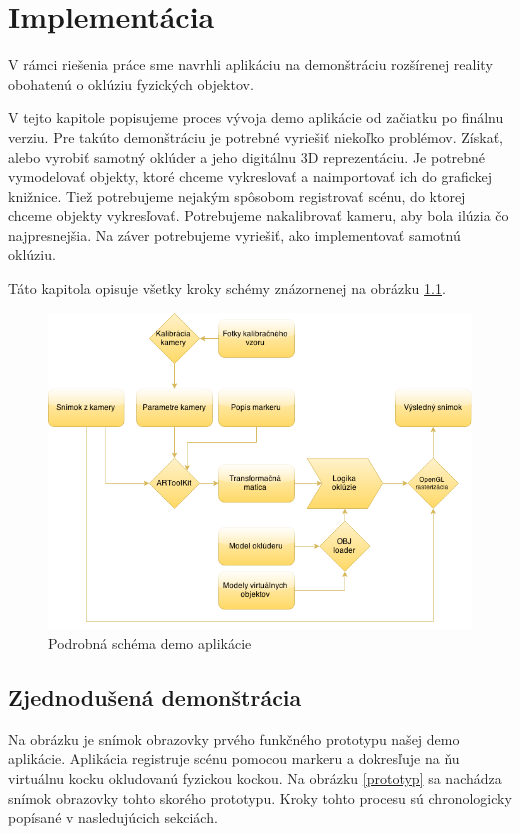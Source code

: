 \chapter{Implementácia}

V rámci riešenia práce sme navrhli aplikáciu na demonštráciu rozšírenej reality obohatenú o oklúziu fyzických objektov.

V tejto kapitole popisujeme proces vývoja demo aplikácie od začiatku po finálnu verziu. Pre takúto demonštráciu je potrebné vyriešiť niekoľko problémov. Získať, alebo vyrobiť samotný oklúder a jeho digitálnu 3D reprezentáciu. Je potrebné vymodelovať objekty, ktoré chceme vykreslovať a naimportovať ich do grafickej knižnice. Tiež potrebujeme nejakým spôsobom registrovať scénu, do ktorej chceme objekty vykresľovať. Potrebujeme nakalibrovať kameru, aby bola ilúzia čo najpresnejšia. Na záver potrebujeme vyriešiť, ako implementovať samotnú oklúziu.

Táto kapitola opisuje všetky kroky schémy znázornenej na obrázku \ref{schema}.

\begin{figure}[h]
 \centering
 \includegraphics[max width=\textwidth]{pictures/schema.png}
 \caption{Podrobná schéma demo aplikácie}
 \label{schema}
 \end{figure}

\section{Zjednodušená demonštrácia}
\label{section-prototyp}

Na obrázku je snímok obrazovky prvého funkčného prototypu našej demo aplikácie. Aplikácia registruje scénu pomocou markeru a dokresľuje na ňu virtuálnu kocku okludovanú fyzickou kockou. Na obrázku \ref{prototyp} sa nachádza snímok obrazovky tohto skorého prototypu. Kroky tohto procesu sú chronologicky popísané v nasledujúcich sekciách.


